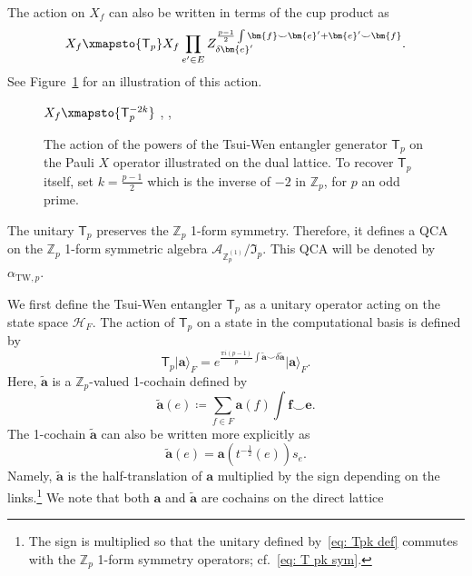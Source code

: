\documentclass[aps,twocolumn,prx,floatfix,preprintnumbers, nofootinbib,10pt]{revtex4-2}
\numberwithin{equation}{section}
\theoremstyle{definition}
\theoremstyle{remark}
\theoremstyle{claim}
\newcommand{\aTWp}{\alpha_{\text{TW},p}}
\newcommand{\Z}{{\mathbb Z}}
\def\ket#1{{|{#1}\rangle}}
\renewcommand{\sf}[1]{\mathsf{#1}}
\begin{document}
The action on $X_f$ can also be written in terms of the cup product as
\begin{equation}
X_f \xmapsto{\sf{T}_p} X_f \prod_{e^{\prime} \in E} Z_{\delta \bm{e}^{\prime}}^{\frac{p-1}{2} \int \bm{f} \smile \bm{e}^{\prime} + \bm{e}^{\prime} \smile \bm{f}}.
\end{equation}
See Figure~\ref{fig: Tpk} for an illustration of this action.
\begin{figure}
\centering
$X_f \xmapsto{\sf{T}_p^{-2k}}$
,
,
\caption{The action of the powers of the Tsui-Wen entangler generator $\sf{T}_p$ on the Pauli $X$ operator illustrated on the dual lattice. To recover $\sf{T}_p$ itself, set $k = \frac{p - 1}{2}$ which is the inverse of $-2$ in $\Z_p$, for $p$ an odd prime.}
\label{fig: Tpk}
\end{figure}

The unitary $\mathsf{T}_p$ preserves the $\mathbb{Z}_p$ 1-form symmetry.
Therefore, it defines a QCA on the $\mathbb{Z}_p$ 1-form symmetric algebra $\mathcal{A}_{\mathbb{Z}_p^{(1)}}/\mathfrak{I}_p$.
This QCA will be denoted by $\aTWp$.

\vspace*{\baselineskip}
\noindent{\bf Tsui-Wen entangler $\sf{T}_p$.}
We first define the Tsui-Wen entangler $\sf{T}_p$ as a unitary operator acting on the state space $\mathcal{H}_F$.
The action of $\sf{T}_p$ on a state in the computational basis is defined by \cite{Tsui:2019ykk}
\begin{equation}
\sf{T}_p \ket{\bm{a}}_F = e^{\frac{\pi i (p - 1)}{p} \int \tilde{\bm{a}} \smile \delta \tilde{\bm{a}}} \ket{\bm{a}}_F.
\label{eq: Tpk def}
\end{equation}
Here, $\tilde{\bm{a}}$ is a $\mathbb{Z}_p$-valued 1-cochain defined by
\begin{equation}
\tilde{\bm{a}}(e) \coloneq \sum_{f \in F} \bm{a}(f) \int \bm{f} \smile \bm{e}.
\end{equation}
The 1-cochain $\tilde{\bm{a}}$ can also be written more explicitly as
\begin{equation}
\tilde{\bm{a}}(e) = \bm{a}(t^{-\frac{1}{2}}(e)) s_e.
\label{eq: a tilde}
\end{equation}
Namely, $\tilde{\bm{a}}$ is the half-translation of $\bm{a}$ multiplied by the sign depending on the links.\footnote{The sign is multiplied so that the unitary defined by~\eqref{eq: Tpk def} commutes with the $\mathbb{Z}_p$ 1-form symmetry operators; cf.~\eqref{eq: T pk sym}.}
We note that both $\bm{a}$ and $\tilde{\bm{a}}$ are cochains on the direct lattice
\end{document}
